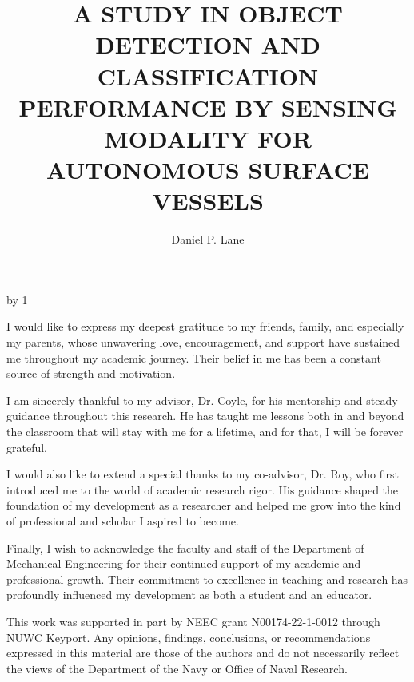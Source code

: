 \documentclass{erauthesis}
\title{A STUDY IN OBJECT DETECTION AND CLASSIFICATION
PERFORMANCE BY SENSING MODALITY FOR AUTONOMOUS
SURFACE VESSELS} %
\author{Daniel P. Lane}
\begin{document}
\frontmatter

\maketitle

\makeatletter 
\advance\fau@frontstage by 1  %


\begin{acknowledgements}

I would like to express my deepest gratitude to my friends, family, and especially my parents, whose unwavering love, encouragement, and support have sustained me throughout my academic journey. Their belief in me has been a constant source of strength and motivation.

I am sincerely thankful to my advisor, Dr. Coyle, for his mentorship and steady guidance throughout this research. He has taught me lessons both in and beyond the classroom that will stay with me for a lifetime, and for that, I will be forever grateful.

I would also like to extend a special thanks to my co-advisor, Dr. Roy, who first introduced me to the world of academic research rigor. His guidance shaped the foundation of my development as a researcher and helped me grow into the kind of professional and scholar I aspired to become.

Finally, I wish to acknowledge the faculty and staff of the Department of Mechanical Engineering for their continued support of my academic and professional growth. 
Their commitment to excellence in teaching and research has profoundly influenced my development as both a student and an educator.

\vspace{3mm}

This work was supported in part by NEEC grant N00174-22-1-0012 through NUWC Keyport.
Any opinions, findings, conclusions, or recommendations expressed in this material are those of the authors and do not necessarily reflect the views of the Department of the Navy or Office of Naval Research.
\end{acknowledgements}
\end{document}
